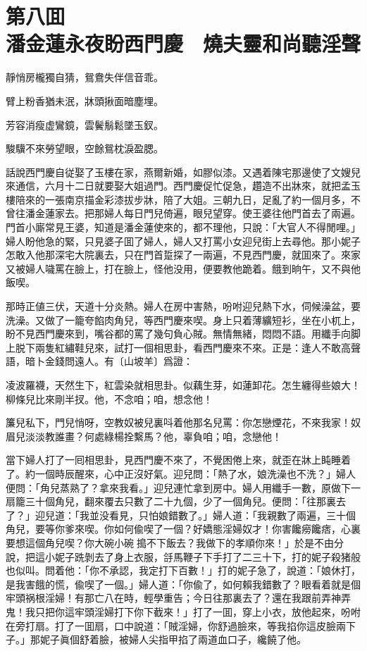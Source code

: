 
\chapter*{第八囬　\\潘金蓮永夜盼西門慶　燒夫靈和尚聽淫聲}


\begin{myquote}
靜悄房櫳獨自猜，鴛鴦失伴信音乖。

臂上粉香猶未泯，牀頭揪面暗塵埋。

芳容消瘦虚鸞鏡，雲鬢鬅鬆墜玉釵。

駿驥不來勞望眼，空餘鴛枕淚盈腮。
\end{myquote}

話說西門慶自従娶了玉樓在家，燕爾新婚，如膠似漆。又遇着陳宅那邊使了文嫂兒來通信，六月十二日就要娶大姐過門。西門慶促忙促急，趲造不出牀來，就把孟玉樓陪來的一張南京描金彩漆拔步牀，陪了大姐。三朝九日，足亂了約一個月多，不曾往潘金蓮家去。把那婦人每日門兒倚遍，眼兒望穿。使王婆往他門首去了兩遍。門首小廝常見王婆，知道是潘金蓮使來的，都不理他，只說：「大官人不得閒哩。」婦人盼他急的緊，只見婆子囬了婦人，婦人又打罵小女迎兒街上去尋他。那小妮子怎敢入他那深宅大院裏去，只在門首踅探了一兩遍，不見西門慶，就囬來了。來家又被婦人噦罵在臉上，打在臉上，怪他没用，便要教他跪着。餓到晌午，又不與他飯喫。

那時正値三伏，天道十分炎熱。婦人在房中害熱，吩咐迎兒熱下水，伺候澡盆，要洗澡。又做了一籠夸餡肉角兒，等西門慶來喫。身上只着薄纊短衫，坐在小杌上，盼不見西門慶來到，嘴谷都的罵了幾句負心賊。無情無緒，悶悶不語。用纖手向脚上脱下兩隻紅繡鞋兒來，試打一個相思卦，看西門慶來不來。正是：逢人不敢高聲語，暗卜金錢問遠人。有〔山坡羊〕爲證：

\begin{myquote}
凌波羅襪，天然生下，紅雲染就相思卦。似藕生芽，如蓮卸花。怎生纏得些娘大！柳條兒比來剛半扠。他，不念咱；咱，想念他！

簾兒私下，門兒悄呀，空教奴被兒裏呌着他那名兒罵：你怎戀煙花，不來我家！奴眉兒淡淡教誰畫？何處綠楊拴繫馬？他，辜負咱；咱，念戀他！
\end{myquote}

當下婦人打了一囘相思卦，見西門慶不來了，不覺困倦上來，就歪在牀上盹睡着了。約一個時辰醒來，心中正沒好氣。迎兒問：「熱了水，娘洗澡也不洗？」婦人便問：「角兒蒸熟了？拿來我看。」迎兒連忙拿到房中。婦人用纖手一數，原做下一扇籠三十個角兒，翻來覆去只數了二十九個，少了一個角兒。便問：「往那裏去了？」迎兒道：「我並没看見，只怕娘錯數了。」婦人道：「我親數了兩遍，三十個角兒，要等你爹來喫。你如何偸喫了一個？好嬌態淫婦奴才！你害饞癆饞痞，心裏要想這個角兒喫？你大碗小碗𠳹搗不下飯去？我做下的孝順你來！」於是不由分說，把這小妮子跣剝去了身上衣服，㧱馬鞭子下手打了二三十下，打的妮子殺猪般也似叫。問着他：「你不承認，我定打下百數！」打的妮子急了，說道：「娘休打，是我害餓的慌，偸喫了一個。」婦人道：「你偸了，如何賴我錯數了？眼看着就是個牢頭祸根淫婦！有那亡八在時，輕學重告；今日往那裏去了？還在我跟前弄神弄鬼！我只把你這牢頭淫婦打下你下截來！」打了一囬，穿上小衣，放他起來，吩咐在旁打扇。打了一囬扇，口中說道：「賊淫婦，你舒過臉來，等我掐你這皮臉兩下子。」那妮子眞個舒着臉，被婦人尖指甲掐了兩道血口子，纔饒了他。

